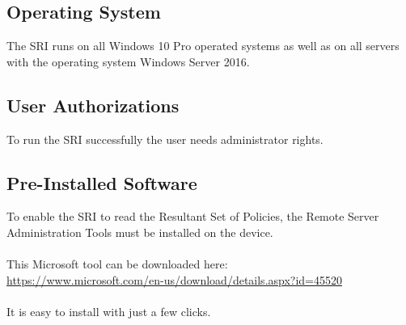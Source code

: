 
\thispagestyle{plain}
\renewcommand\section{\stdsection}
\setcounter{section}{2}
\subsection{Operating System}
The SRI runs on all Windows 10 Pro operated systems as well as on all servers with the operating system Windows Server 2016.
\subsection{User Authorizations}
To run the SRI successfully the user needs administrator rights.
\subsection{Pre-Installed Software}
To enable the SRI to read the Resultant Set of Policies, the Remote Server Administration Tools must be installed on the device.
\\\\
This Microsoft tool can be downloaded here: \ \\
\url{https://www.microsoft.com/en-us/download/details.aspx?id=45520}
\\\\
It is easy to install with just a few clicks.